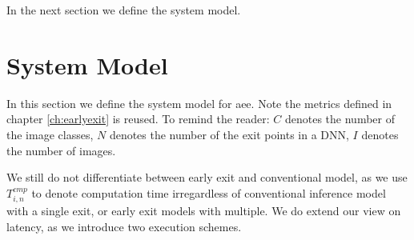 In the next section we define the system model.

\section{System Model} \label{sec:edge-system-model}

In this section we define the system model for \gls{aee}. Note the metrics defined in chapter \ref{ch:earlyexit} is reused. To remind the reader:  $ C $ denotes the number of the image classes, $ N $ denotes the number of the exit points in a DNN, $ I $ denotes the number of images. 

We still do not differentiate between early exit and conventional model,  as we use $ T_{i,n}^{cmp} $ to denote computation time irregardless of conventional inference model with a single exit, or early exit models with multiple. We do extend our view on latency, as we introduce two execution schemes.
	
